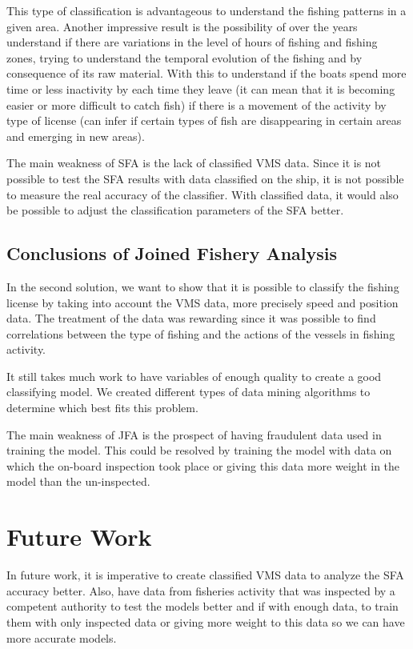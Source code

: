 This type of classification is advantageous to understand the fishing patterns in a given area. Another impressive result is the possibility of over the years understand if there are variations in the level of hours of fishing and fishing zones, trying to understand the temporal evolution of the fishing and by consequence of its raw material. With this to understand if the boats spend more time or less inactivity by each time they leave (it can mean that it is becoming easier or more difficult to catch fish) if there is a movement of the activity by type of license (can infer if certain types of fish are disappearing in certain areas and emerging in new areas).


The main weakness of SFA is the lack of classified VMS data. Since it is not possible to test the SFA results with data classified on the ship, it is not possible to measure the real accuracy of the classifier. With classified data, it would also be possible to adjust the classification parameters of the SFA better.


\subsection{Conclusions of Joined Fishery Analysis} %
\label{sub:con_jfa}
In the second solution, we want to show that it is possible to classify the fishing license by taking into account the VMS data, more precisely speed and position data.
The treatment of the data was rewarding since it was possible to find correlations between the type of fishing and the actions of the vessels in fishing activity.

It still takes much work to have variables of enough quality to create a good classifying model.
We created different types of data mining algorithms to determine which best fits this problem.

The main weakness of JFA is the prospect of having fraudulent data used in training the model. This could be resolved by training the model with data on which the on-board inspection took place or giving this data more weight in the model than the un-inspected.



\section{Future Work} %
\label{sub:future_work}

In future work, it is imperative to create classified VMS data to analyze the SFA accuracy better. Also, have data from fisheries activity that was inspected by a competent authority to test the models better and if with enough data, to train them with only inspected data or giving more weight to this data so we can have more accurate models.
 








